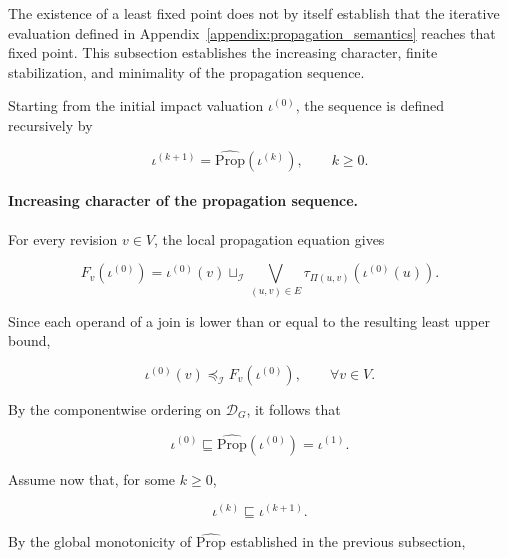 \documentclass[10pt]{article}
\begin{document}
The existence of a least fixed point does not by itself establish that the iterative evaluation defined in Appendix~\ref{appendix:propagation_semantics}
reaches that fixed point. This subsection establishes the increasing character, finite stabilization, and minimality of the propagation sequence.

Starting from the initial impact valuation $\iota^{(0)}$, the sequence is defined recursively by

\begin{equation}
	\iota^{(k+1)}
	=
	\widehat{\mathrm{Prop}}
	\!\left(
	\iota^{(k)}
	\right),
	\qquad
	k\geq 0.
	\label{eq:kleene_iteration}
\end{equation}

\paragraph{Increasing character of the propagation sequence.}

For every revision $v\in V$, the local propagation equation gives

\begin{equation}
	F_v\!\left(\iota^{(0)}\right)
	=
	\iota^{(0)}(v)
	\sqcup_{\mathcal I}
	\bigvee_{(u,v)\in E}
	\tau_{\Pi(u,v)}
	\!\left(
	\iota^{(0)}(u)
	\right).
	\label{eq:initial_local_expansion}
\end{equation}

Since each operand of a join is lower than or equal to the resulting least upper bound,

\begin{equation}
	\iota^{(0)}(v)
	\preceq_{\mathcal I}
	F_v\!\left(\iota^{(0)}\right),
	\qquad
	\forall v\in V.
	\label{eq:initial_component_growth}
\end{equation}

By the componentwise ordering on $\mathcal D_G$, it follows that

\begin{equation}
	\iota^{(0)}
	\sqsubseteq
	\widehat{\mathrm{Prop}}
	\!\left(
	\iota^{(0)}
	\right)
	=
	\iota^{(1)}.
	\label{eq:initial_iteration_growth}
\end{equation}

Assume now that, for some $k\geq 0$,

\begin{equation}
	\iota^{(k)}
	\sqsubseteq
	\iota^{(k+1)}.
	\label{eq:iteration_induction_hypothesis}
\end{equation}

By the global monotonicity of $\widehat{\mathrm{Prop}}$ established in the
previous subsection,
\end{document}
